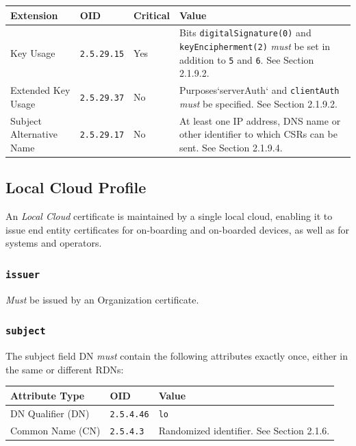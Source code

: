 \vspace*{0.5cm}
\noindent\begin{tabularx}{\textwidth}{| p{4cm} | p{2cm} | p{1.2cm} | X |} \hline
\rowcolor{gray!33} Extension & OID                & Critical & Value \\ \hline

Key Usage                    & \texttt{2.5.29.15} & Yes      & Bits \texttt{digitalSignature(0)} and \texttt{keyEncipherment(2)} \textit{must} be set in addition to \texttt{5} and \texttt{6}. See Section 2.1.9.2. \\ \hline
Extended Key Usage           & \texttt{2.5.29.37} & No       & Purposes`serverAuth` and \texttt{clientAuth} \textit{must} be specified. See Section 2.1.9.2. \\ \hline
Subject Alternative Name     & \texttt{2.5.29.17} & No       & At least one IP address, DNS name or other identifier to which CSRs can be sent. See Section 2.1.9.4. \\ \hline

\end{tabularx}
\vspace*{0.5cm}

\newpage
\subsection{Local Cloud Profile}

An \textit{Local Cloud} certificate is maintained by a single local cloud, enabling it to issue end entity certificates for on-boarding and on-boarded devices, as well as for systems and operators.

\subsubsection{\texttt{issuer}}

\textit{Must} be issued by an Organization certificate.

\subsubsection{\texttt{subject}}

The subject field DN \textit{must} contain the following attributes exactly once, either in the same or different RDNs:

\vspace*{0.5cm}
\noindent\begin{tabularx}{\textwidth}{| p{4cm} | p{2cm} | X |} \hline
\rowcolor{gray!33} Attribute Type & OID               & Value \\ \hline

DN Qualifier (DN)                 & \texttt{2.5.4.46} & \texttt{lo} \\ \hline
Common Name (CN)                  & \texttt{2.5.4.3}  &  Randomized identifier. See Section 2.1.6. \\ \hline

\end{tabularx}
\vspace*{0.5cm}

